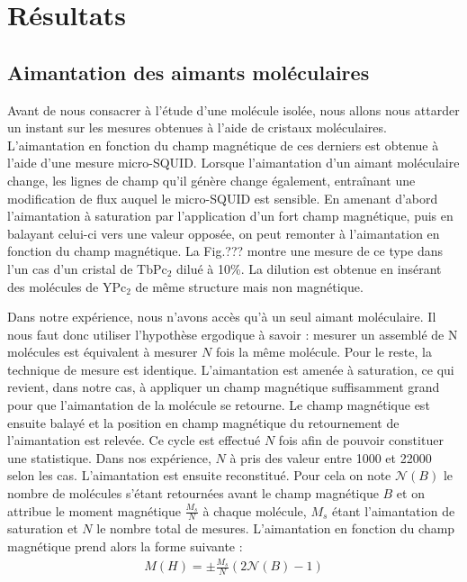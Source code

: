 \chapter{Résultats}

\section{Aimantation des aimants moléculaires}
Avant de nous consacrer à l'étude d'une molécule isolée, nous allons nous attarder un instant sur les mesures obtenues à l'aide de cristaux moléculaires. L'aimantation en fonction du champ magnétique de ces derniers est obtenue à l'aide d'une mesure micro-SQUID. Lorsque l'aimantation d'un aimant moléculaire change, les lignes de champ qu'il génère change également, entraînant une modification de flux auquel le micro-SQUID est sensible. En amenant d'abord l'aimantation à saturation par l'application d'un fort champ magnétique, puis en balayant celui-ci vers une valeur opposée, on peut remonter à l'aimantation en fonction du champ magnétique. La Fig.??? montre une mesure de ce type dans l'un cas d'un cristal de TbPc$_2$ dilué à 10\%. La dilution est obtenue en insérant des molécules de YPc$_2$ de même structure mais non magnétique.

Dans notre expérience, nous n'avons accès qu'à un seul aimant moléculaire. Il nous faut donc utiliser l'hypothèse ergodique à savoir : mesurer un assemblé de N molécules est équivalent à mesurer $N$ fois la même molécule. Pour le reste, la technique de mesure est identique. L'aimantation est amenée à saturation, ce qui revient, dans notre cas, à appliquer un champ magnétique suffisamment grand pour que l'aimantation de la molécule se retourne. Le champ magnétique est ensuite balayé et la position en champ magnétique du retournement de l'aimantation est relevée. Ce cycle est effectué $N$ fois afin de pouvoir constituer une statistique. Dans nos expérience, $N$ à pris des valeur entre 1000 et 22000 selon les cas. L'aimantation est ensuite reconstitué. Pour cela on note $\mathscr{N}(B)$ le nombre de molécules s'étant retournées avant le champ magnétique $B$ et on attribue le moment magnétique $\frac{M_s}{N}$ à chaque molécule, $M_s$ étant l'aimantation de saturation et $N$ le nombre total de mesures. L'aimantation en fonction du champ magnétique prend alors la forme suivante :
\begin{eqnarray}
M(H) =\pm \frac{M_s}{N}(2\mathscr{N}(B) -1)\nonumber
\end{eqnarray}

